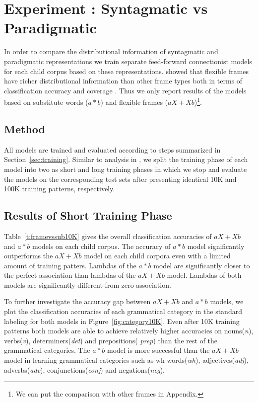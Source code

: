 \section{Experiment : Syntagmatic vs Paradigmatic}
\label{s:exp_paradigmatic}

In order to compare the distributional information of syntagmatic and
paradigmatic representations we train separate feed-forward connectionist
models for each child corpus based on these representations.  \cite{clair2010}
showed that flexible frames have richer distributional information than other
frame types both in terms of classification accuracy and coverage .  Thus we
only report results of the models based on substitute words ($a*b$) and
flexible frames ($aX+Xb$)\footnote{We can put the comparison with other frames
in Appendix.}. 

\subsection{Method} 
All models are trained and evaluated according to steps summarized in
Section~\ref{sec:training}.  Similar to analysis in \cite{clair2010}, we split
the training phase of each model into two as short and long training phases in
which we stop and evaluate the models on the corresponding test sets after
presenting identical 10K and 100K training patterns, respectively.  

\subsection{Results of Short Training Phase}
Table~\ref{t:framevssub10K} gives the overall classification accuracies of
$aX+Xb$ and $a*b$ models on each child corpus.  The accuracy of $a*b$ model
significantly outperforms the $aX+Xb$ model on each child corpora even with a
limited amount of training patters.  Lambdas of the $a*b$ model are
significantly closer to the perfect association than lambdas of the $aX+Xb$
model.  Lambdas of both models are significantly different from zero
association.


To further investigate the accuracy gap between $aX+Xb$ and $a*b$ models, we
plot the classification accuracies of each grammatical category in the standard
labeling for both models in Figure~\ref{fig:category10K}.  Even after 10K
training patterns both models are able to achieve relatively higher accuracies
on nouns({\it n}), verbs({\it v}), determiners({\it det}) and prepositions({\it
prep}) than the rest of the grammatical categories.  The $a*b$ model is more
successful than the $aX+Xb$ model in learning grammatical categories such as
wh-words({\it wh}), adjectives({\it adj}), adverbs({\it adv}),
conjunctions({\it conj}) and negations({\it neg}). 

